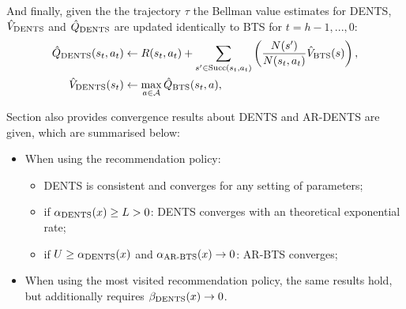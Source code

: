         And finally, given the the trajectory $\tau$ the Bellman value estimates for DENTS, ${\hat{V}_{{\textnormal{DENTS}}}}$ and ${\hat{Q}_{{\textnormal{DENTS}}}}$ are updated identically to BTS for $t=h-1,...,0$:
        \begin{align}
            {\hat{Q}_{{\textnormal{DENTS}}}}(s_t,a_t) &\leftarrow 
                R(s_t,a_t) + \sum_{s' \in {\textnormal{Succ}(s_t,a_t)}} \left( \frac{N(s')}{N(s_t,a_t)} {\hat{V}_{{\textnormal{BTS}}}}(s) \right), 
                        \label{eq:dents_q_backup} \\ 
            {\hat{V}_{{\textnormal{DENTS}}}}(s_t) &\leftarrow \max_{a\in\mathcal{A}} {\hat{Q}_{{\textnormal{BTS}}}}(s_t,a), 
                        \label{eq:dents_v_backup} 
        \end{align}

        










        Section  also provides convergence results about DENTS and AR-DENTS are given, which are summarised below:
        \begin{itemize}
            \item When using the  recommendation policy:
            \begin{itemize}
                \item DENTS is consistent and converges for any setting of parameters;
                \item if ${\alpha_{{\textnormal{DENTS}}}}(x) \geq L > 0$: DENTS converges with an theoretical exponential rate;
                \item if $U \geq {\alpha_{{\textnormal{DENTS}}}}(x)$ and ${\alpha_{{\textnormal{AR-BTS}}}}(x) \rightarrow 0$: AR-BTS converges;
            \end{itemize}
            \item When using the most visited recommendation policy, the same results hold, but additionally requires ${\beta_{{\textnormal{DENTS}}}}(x)\rightarrow 0$.
        \end{itemize}











